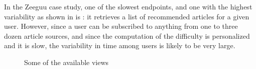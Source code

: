 \documentclass[conference]{IEEEtran}
\begin{document}
In the Zeeguu case study, one of the slowest endpoints, and one with the highest variability as shown in  is \epFeedItems: it retrieves a list of recommended articles for a given user. However, since a user can be subscribed to anything from one to three dozen article sources, and since the computation of the difficulty is personalized and it is slow, the variability in time among users is likely to be very large. 



\begin{figure}[h!]
  \centering
  \caption{Some of the available views\label{fig:views}}
\end{figure}
\end{document}
